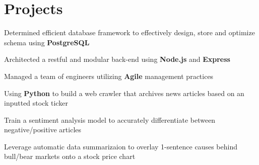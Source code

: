 \documentclass[letterpaper]{deedy-resume} %
\begin{document}
\begin{minipage}[t]{0.66\textwidth}

  \section{Projects}
%  
%  
%


  \begin{tightitemize}
  \item Determined efficient database framework to effectively design, store and optimize schema using \textbf{PostgreSQL}
  \item Architected a restful and modular back-end using \textbf{Node.js} and \textbf{Express}
  \item Managed a team of engineers utilizing \textbf{Agile} management practices
  \end{tightitemize}



  \begin{tightitemize}
  \item Using \textbf{Python} to build a web crawler that archives news articles based on an inputted stock ticker
  \item Train a sentiment analysis model to accurately differentiate between negative/positive articles
  \item Leverage automatic data summarizaion to overlay 1-sentence causes behind bull/bear markets onto a stock price chart
  \end{tightitemize}


\end{minipage}
\end{document}
